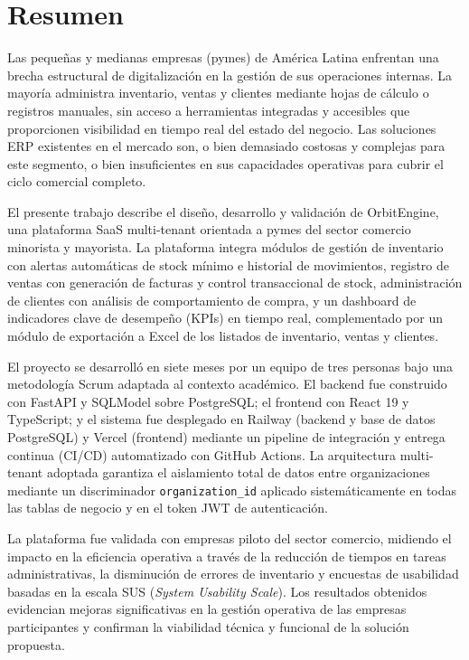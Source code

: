\chapter*{Resumen}

Las pequeñas y medianas empresas (pymes) de América Latina enfrentan una brecha estructural de digitalización en la gestión de sus operaciones internas. La mayoría administra inventario, ventas y clientes mediante hojas de cálculo o registros manuales, sin acceso a herramientas integradas y accesibles que proporcionen visibilidad en tiempo real del estado del negocio. Las soluciones ERP existentes en el mercado son, o bien demasiado costosas y complejas para este segmento, o bien insuficientes en sus capacidades operativas para cubrir el ciclo comercial completo.

El presente trabajo describe el diseño, desarrollo y validación de OrbitEngine, una plataforma SaaS multi-tenant orientada a pymes del sector comercio minorista y mayorista. La plataforma integra módulos de gestión de inventario con alertas automáticas de stock mínimo e historial de movimientos, registro de ventas con generación de facturas y control transaccional de stock, administración de clientes con análisis de comportamiento de compra, y un dashboard de indicadores clave de desempeño (KPIs) en tiempo real, complementado por un módulo de exportación a Excel de los listados de inventario, ventas y clientes.

El proyecto se desarrolló en siete meses por un equipo de tres personas bajo una metodología Scrum adaptada al contexto académico. El backend fue construido con FastAPI y SQLModel sobre PostgreSQL; el frontend con React 19 y TypeScript; y el sistema fue desplegado en Railway (backend y base de datos PostgreSQL) y Vercel (frontend) mediante un pipeline de integración y entrega continua (CI/CD) automatizado con GitHub Actions. La arquitectura multi-tenant adoptada garantiza el aislamiento total de datos entre organizaciones mediante un discriminador \texttt{organization\_id} aplicado sistemáticamente en todas las tablas de negocio y en el token JWT de autenticación.

La plataforma fue validada con empresas piloto del sector comercio, midiendo el impacto en la eficiencia operativa a través de la reducción de tiempos en tareas administrativas, la disminución de errores de inventario y encuestas de usabilidad basadas en la escala SUS (\emph{System Usability Scale}). Los resultados obtenidos evidencian mejoras significativas en la gestión operativa de las empresas participantes y confirman la viabilidad técnica y funcional de la solución propuesta.


